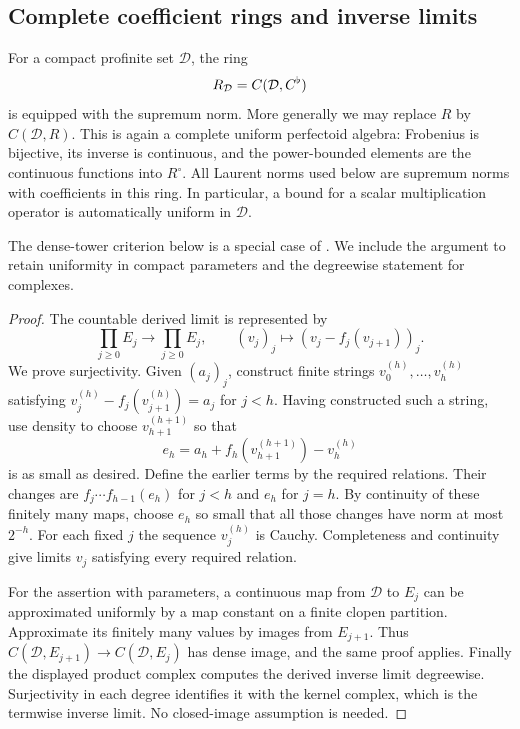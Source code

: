 \subsection{Complete coefficient rings and inverse limits}

For a compact profinite set $\mathcal D$, the ring
\[
 R_{\mathcal D}=C(\mathcal D,C^\flat)
\]
is equipped with the supremum norm.  More generally we may replace
$R$ by $C(\mathcal D,R)$.  This is again a complete uniform perfectoid
algebra: Frobenius is bijective, its inverse is continuous, and the
power-bounded elements are the continuous functions into $R^\circ$.
All Laurent norms used below are supremum norms with coefficients in
this ring.  In particular, a bound for a scalar multiplication
operator is automatically uniform in $\mathcal D$.

The dense-tower criterion below is a special case of
\citet[Proposition~3.5]{lebras2018}. We include the argument to
retain uniformity in compact parameters and the degreewise statement
for complexes.


\begin{proof}
The countable derived limit is represented by
\[
 \prod_{j\geq0}E_j\longrightarrow\prod_{j\geq0}E_j,
 \qquad (v_j)_j\longmapsto(v_j-f_j(v_{j+1}))_j.
\]
We prove surjectivity.  Given $(a_j)_j$, construct finite strings
$v^{(h)}_0,\ldots,v^{(h)}_h$ satisfying
$v^{(h)}_j-f_j(v^{(h)}_{j+1})=a_j$ for $j<h$.
Having constructed such a string, use density to choose
$v^{(h+1)}_{h+1}$ so that
\[
 e_h=a_h+f_h(v^{(h+1)}_{h+1})-v^{(h)}_h
\]
is as small as desired.  Define the earlier terms by the required
relations.  Their changes are
$f_j\cdots f_{h-1}(e_h)$ for $j<h$ and $e_h$ for $j=h$.
By continuity of these finitely many maps, choose $e_h$ so small that
all those changes have norm at most $2^{-h}$.  For each fixed $j$ the
sequence $v^{(h)}_j$ is Cauchy.  Completeness and continuity give limits
$v_j$ satisfying every required relation.

For the assertion with parameters, a continuous map from
$\mathcal D$ to $E_j$ can be approximated uniformly by a map constant
on a finite clopen partition.  Approximate its finitely many values
by images from $E_{j+1}$.  Thus
$C(\mathcal D,E_{j+1})\to C(\mathcal D,E_j)$ has dense image, and the
same proof applies.  Finally the displayed product complex computes
the derived inverse limit degreewise.  Surjectivity in each degree
identifies it with the kernel complex, which is the termwise inverse
limit.  No closed-image assumption is needed.
\end{proof}


